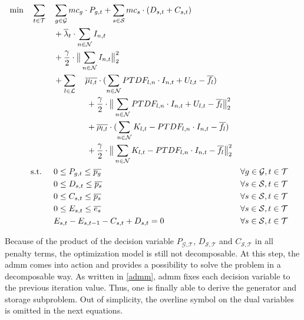 \begin{subequations}
	\begin{align}
		 \min \quad \sum_{t\in\mathcal{T}} \quad & \sum_{g\in\mathcal{G}}mc_g \cdot P_{g,t} + \sum_{s\in\mathcal{S}}mc_s \cdot (D_{s,t}+C_{s,t}) \label{eq:dom:final} \\
		 & + \overline{\lambda}_t \cdot \sum_{n \in \mathcal{N}} I_{n,t} \nonumber \\
		 & + \frac{\gamma}{2} \cdot \big\|\sum_{n \in \mathcal{N}} I_{n,t}\big\|^2_2 \nonumber \\
		 & +  \sum_{l \in \mathcal{L}} \quad \overline{\mu_{l,t}} \cdot (\sum_{n \in \mathcal{N}} PTDF_{l,n} \cdot I_{n,t} + U_{l,t} - \overline{f_l}) \nonumber \\
		 & \qquad \qquad + \frac{\gamma}{2} \cdot \big\| \sum_{n \in \mathcal{N}} PTDF_{l,n} \cdot I_{n,t} + U_{l,t} - \overline{f_l} \big\|^2_2 \nonumber \\
		 & \qquad \qquad + \overline{\rho_{l,t}} \cdot (\sum_{n \in \mathcal{N}} K_{l,t} - PTDF_{l,n} \cdot I_{n,t} - \overline{f_l}) \nonumber \\
		 & \qquad \qquad + \frac{\gamma}{2} \cdot \big\|\sum_{n \in \mathcal{N}} K_{l,t} - PTDF_{l,n} \cdot I_{n,t} - \overline{f_l} \big\|^2_2 \nonumber \\
		 \text{s.t. } \quad & 0 \leq P_{g,t} \leq \overline{p_g} && \forall g \in \mathcal{G}, t \in \mathcal{T}\\
		 & 0 \leq D_{s,t} \leq \overline{p_s} && \forall s \in \mathcal{S}, t \in \mathcal{T} \\
		 & 0 \leq C_{s,t} \leq \overline{p_s} && \forall s \in \mathcal{S}, t \in \mathcal{T} \\
		 & 0 \leq E_{s,t} \leq \overline{e_s} && \forall s \in \mathcal{S}, t \in \mathcal{T} \\
		 & E_{s,t} - E_{s,t-1} - C_{s,t} + D_{s,t} = 0 && \forall s \in \mathcal{S}, t \in \mathcal{T}
	\end{align}
\end{subequations}

Because of the product of the decision variable $P_{\mathcal{G},\mathcal{T}}$, $D_{\mathcal{S},\mathcal{T}}$ and $C_{\mathcal{S},\mathcal{T}}$ in all penalty terms, the optimization model is still not decomposable. At this step, the \gls{admm} comes into action and provides a possibility to solve the problem in a decomposable way. As written in \ref{admm}, \gls{admm} fixes each decision variable to the previous iteration value. Thus, one is finally able to derive the generator and storage subproblem. Out of simplicity, the overline symbol on the dual variables is omitted in the next equations.


